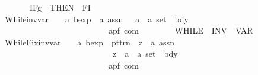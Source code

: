 \begin{isabellebody}
\ \ \ \ \ \ \ \ {\isacharparenleft}{\isachardoublequoteopen}{\isacharparenleft}{}IF\isactrlsub g\ {\isacharparenleft}{\isacharunderscore}{\isacharparenright}{\isacharslash}\ {\isacharparenleft}{}THEN\ {\isacharunderscore}{\isacharparenright}{\isacharslash}\ FI{\isacharparenright}{\isachardoublequoteclose}\ {\isacharbrackleft}{}{\isacharcomma}\ {}{\isacharbrackright}\ {}{}{\isacharparenright}\isanewline
\ \ {\isachardoublequoteopen}{\isacharunderscore}While{\isacharunderscore}inv{\isacharunderscore}var{\isachardoublequoteclose}\ \ \ {\isacharcolon}{\isacharcolon}\ {\isachardoublequoteopen}{\isacharprime}a\ bexp\ {\isacharequal}{\isachargreater}\ {\isacharprime}a\ assn\ \ {\isasymRightarrow}\ {\isacharparenleft}{\isacharprime}a\ {\isasymtimes}\ {\isacharprime}a{\isacharparenright}\ set\ {\isasymRightarrow}\ bdy\ \isanewline
\ \ \ \ \ \ \ \ \ \ \ \ \ \ \ \ \ \ \ \ \ \ \ \ \ \ {\isasymRightarrow}\ {\isacharparenleft}{\isacharprime}a{\isacharcomma}{\isacharprime}p{\isacharcomma}{\isacharprime}f{\isacharparenright}\ com{\isachardoublequoteclose}\isanewline
\ \ \ \ \ \ \ \ {\isacharparenleft}{\isachardoublequoteopen}{\isacharparenleft}{}WHILE\ {\isacharparenleft}{\isacharunderscore}{\isacharparenright}{\isacharslash}\ INV\ {\isacharparenleft}{\isacharunderscore}{\isacharparenright}{\isacharslash}\ VAR\ {\isacharparenleft}{\isacharunderscore}{\isacharparenright}\ {\isacharslash}{\isacharunderscore}{\isacharparenright}{\isachardoublequoteclose}\ \ {\isacharbrackleft}{}{}{\isacharcomma}\ {}{\isacharcomma}\ {}{\isacharcomma}\ {}{}{\isacharbrackright}\ {}{}{\isacharparenright}\isanewline
\ \ {\isachardoublequoteopen}{\isacharunderscore}WhileFix{\isacharunderscore}inv{\isacharunderscore}var{\isachardoublequoteclose}\ \ \ {\isacharcolon}{\isacharcolon}\ {\isachardoublequoteopen}{\isacharprime}a\ bexp\ {\isacharequal}{\isachargreater}\ pttrn\ {\isasymRightarrow}\ {\isacharparenleft}{\isacharprime}z\ {\isasymRightarrow}\ {\isacharprime}a\ assn{\isacharparenright}\ \ {\isasymRightarrow}\ \isanewline
\ \ \ \ \ \ \ \ \ \ \ \ \ \ \ \ \ \ \ \ \ \ \ \ \ \ \ \ {\isacharparenleft}{\isacharprime}z\ {\isasymRightarrow}\ {\isacharparenleft}{\isacharprime}a\ {\isasymtimes}\ {\isacharprime}a{\isacharparenright}\ set{\isacharparenright}\ {\isasymRightarrow}\ bdy\ \isanewline
\ \ \ \ \ \ \ \ \ \ \ \ \ \ \ \ \ \ \ \ \ \ \ \ \ \ {\isasymRightarrow}\ {\isacharparenleft}{\isacharprime}a{\isacharcomma}{\isacharprime}p{\isacharcomma}{\isacharprime}f{\isacharparenright}\ com{\isachardoublequoteclose}\isanewline

\end{isabellebody}
